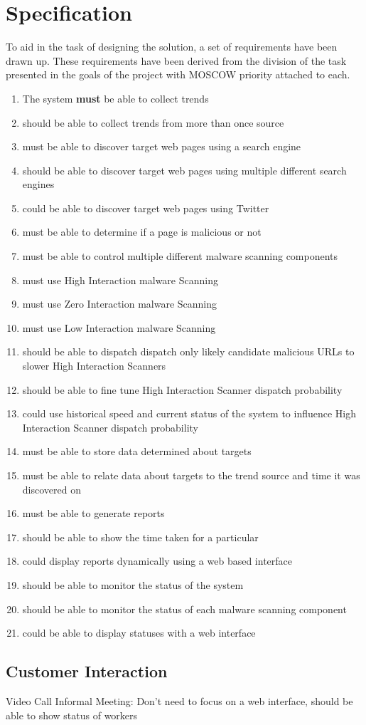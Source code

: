 \clearpage
\section{Specification}

To aid in the task of designing the solution, a set of requirements have been drawn up. These requirements have been derived from the division of the task presented in the goals of the project with MOSCOW priority attached to each.

\begin{enumerate}
    \item The system \textbf{must} be able to collect trends
    \item should be able to collect trends from more than once source
    
    \item must be able to discover target web pages using a search engine
    \item should be able to discover target web pages using multiple different search engines
    \item could be able to discover target web pages using Twitter
    
    \item must be able to determine if a page is malicious or not
    \item must be able to control multiple different malware scanning components
    \item must use High Interaction malware Scanning
    \item must use Zero Interaction malware Scanning
    \item must use Low Interaction malware Scanning
    \item should be able to dispatch dispatch only likely candidate malicious URLs to slower High Interaction Scanners
    \item should be able to fine tune High Interaction Scanner dispatch probability
    \item could use historical speed and current status of the system to influence High Interaction Scanner dispatch probability

    \item must be able to store data determined about targets
    \item must be able to relate data about targets to the trend source and time it was discovered on
    \item must be able to generate reports
    \item should be able to show the time taken for a particular 
    \item could display reports dynamically using a web based interface
    \item should be able to monitor the status of the system
    \item should be able to monitor the status of each malware scanning component
    \item could be able to display statuses with a web interface
\end{enumerate}

\subsection{Customer Interaction}
Video Call
Informal Meeting: Don't need to focus on a web interface, should be able to show status of workers

